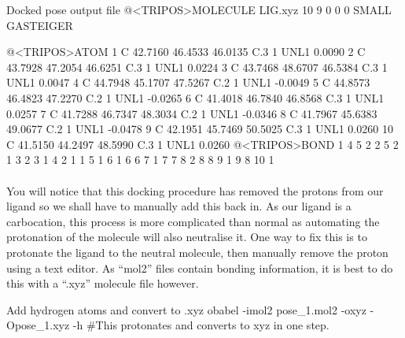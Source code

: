     \begin{bashoutput}[label=out:mol2]{Docked pose output file}
@<TRIPOS>MOLECULE
LIG.xyz
 10 9 0 0 0
SMALL
GASTEIGER

@<TRIPOS>ATOM
      1 C  42.7160   46.4533   46.0135 C.3     1  UNL1        0.0090
      2 C  43.7928   47.2054   46.6251 C.3     1  UNL1        0.0224
      3 C  43.7468   48.6707   46.5384 C.3     1  UNL1        0.0047
      4 C  44.7948   45.1707   47.5267 C.2     1  UNL1       -0.0049
      5 C  44.8573   46.4823   47.2270 C.2     1  UNL1       -0.0265
      6 C  41.4018   46.7840   46.8568 C.3     1  UNL1        0.0257
      7 C  41.7288   46.7347   48.3034 C.2     1  UNL1       -0.0346
      8 C  41.7967   45.6383   49.0677 C.2     1  UNL1       -0.0478
      9 C  42.1951   45.7469   50.5025 C.3     1  UNL1        0.0260
     10 C  41.5150   44.2497   48.5990 C.3     1  UNL1        0.0260
@<TRIPOS>BOND
     1     4     5    2
     2     5     2    1
     3     2     3    1
     4     2     1    1
     5     1     6    1
     6     6     7    1
     7     7     8    2
     8     8     9    1
     9     8    10    1
    \end{bashoutput}

    \paragraph{}
        You will notice that this docking procedure has removed the protons from our ligand so we shall have to manually add this back in. As our ligand is a carbocation, this process is more complicated than normal as automating the protonation of the molecule will also neutralise it. One way to fix this is to protonate the ligand to the neutral molecule, then manually remove the proton using a text editor. As \enquote{mol2} files contain bonding information, it is best to do this with a \enquote{.xyz} molecule file however.

    \begin{bashcmd}[label=cmd:addH]{Add hydrogen atoms and convert to .xyz}
        obabel -imol2 pose_1.mol2 -oxyz -Opose_1.xyz -h   
        #This protonates and converts to xyz in one step.
    \end{bashcmd}

